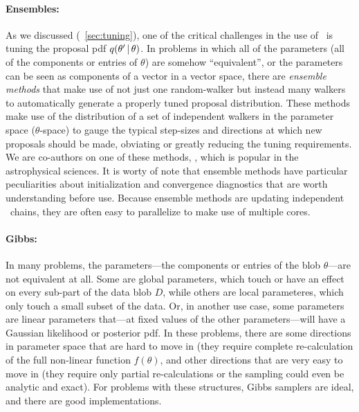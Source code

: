 \documentclass[12pt,twoside,pdftex]{article}
\newcommand{\MCMC}{\acronym{MCMC}}
\newcommand{\data}{D}
\newcommand{\pars}{\theta}
\begin{document}
\paragraph{Ensembles:}
As we discussed (\sectionname~\ref{sec:tuning}), one of the critical challenges in the use of
\MCMC\ is tuning the proposal pdf $q(\pars'\given\pars)$.
In problems in which all of the parameters (all of the components or entries of $\pars$) are somehow ``equivalent'',
or the parameters can be seen as components of a vector in a vector
space, there are \emph{ensemble methods} that make use of not just one
random-walker but instead many walkers to automatically generate a properly tuned
proposal distribution.
These methods make use of the distribution of a set of independent
walkers in the parameter space ($\pars$-space) to gauge the typical step-sizes and
directions at which new proposals should be made, obviating or greatly
reducing the tuning requirements.
We are co-authors on one of these methods,
, which is popular in the
astrophysical sciences.
It is worty of note that ensemble methods have particular
peculiarities about initialization and convergence diagnostics that
are worth understanding before use.
Because ensemble methods are updating independent \MCMC\ chains, they
are often easy to parallelize to make use of multiple cores.

\paragraph{Gibbs:}
In many problems, the parameters---the components or entries of the
blob $\pars$---are not equivalent at all.
Some are global parameters, which touch or have an effect on every
sub-part of the data blob $\data$, while others are local parameteres,
which only touch a small subset of the data.
Or, in another use case, some parameters are linear parameters
that---at fixed values of the other parameters---will have a Gaussian
likelihood or posterior pdf.
In these problems, there are some directions in parameter space that
are hard to move in (they require complete re-calculation of the full
non-linear function $f(\pars)$, and other directions that are very
easy to move in (they require only partial re-calculations or the
sampling could even be analytic and exact).
For problems with these structures, Gibbs samplers are ideal, and
there are good implementations.
\end{document}
